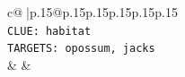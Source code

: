\documentclass{article}
\begin{document}
{\begin{supertabular}{c@{$\;$}|p{.15\linewidth}@{}p{.15\linewidth}p{.15\linewidth}p{.15\linewidth}p{.15\linewidth}p{.15\linewidth}}
{{{\\ 
\texttt{CLUE: habitat} \\
\texttt{TARGETS: opossum, jacks} \\
            }
        }
    }
    & & \\ \\

\end{supertabular}
}
\end{document}
